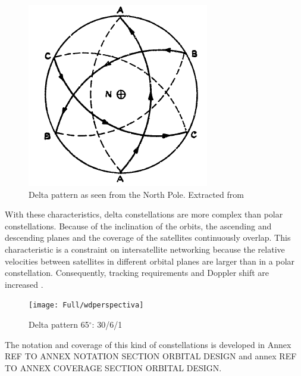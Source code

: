 \begin{figure}[h!]
\centerline{\includegraphics[scale=0.6]{Full/walkerdeltaplanta.png}}
\caption{Delta pattern as seen from the North Pole. Extracted from \cite{Walker1977}}
\label{fig:delta pattern North Pole}
\end{figure}

With these characteristics, delta constellations are more complex than polar constellations. Because of the inclination of the orbits, the ascending and descending planes and the coverage of the satellites continuously overlap. This characteristic is a constraint on intersatellite networking because the relative velocities between satellites in different orbital planes are larger than in a polar constellation. Consequently, tracking requirements and Doppler shift are increased \cite{Wood2001}.

\begin{figure}[h!]
\centerline{\texttt{[image: Full/wdperspectiva]}}
\caption{Delta pattern 65$^{\circ}$: 30/6/1}
\label{fig:delta pattern notation}
\end{figure}

The notation and coverage of this kind of constellations is developed in Annex REF TO ANNEX NOTATION SECTION ORBITAL DESIGN and annex REF TO ANNEX COVERAGE SECTION ORBITAL DESIGN.